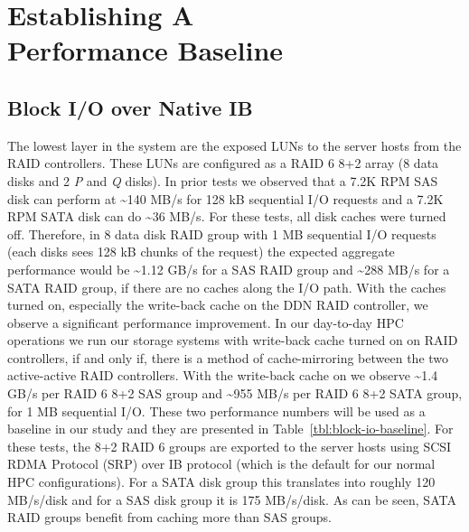 \section{Establishing A \\Performance Baseline}
\label{sec:baseline}

\subsection{Block I/O over Native IB} 
\label{sec:block-io}

The lowest layer in the system are the exposed LUNs to the server hosts from
the RAID controllers.  These LUNs are configured as a RAID 6 8+2 array (8 data
disks and 2 \textit{P} and \textit{Q} disks). In prior tests we observed
that a 7.2K RPM SAS disk can perform at \textasciitilde140 MB/s for 128 kB
sequential I/O requests and a 7.2K RPM SATA disk can do \textasciitilde36 MB/s.
For these tests, all disk caches were turned off. Therefore, in 8 data disk
RAID group with 1 MB sequential I/O requests (each disks sees 128 kB chunks of
the request) the expected aggregate performance would be \textasciitilde1.12
GB/s for a SAS RAID group and \textasciitilde288 MB/s for a SATA RAID group, if
there are no caches along the I/O path.  With the caches turned on, especially
the write-back cache on the DDN RAID controller, we observe a significant
performance improvement. In our day-to-day HPC operations we run our storage
systems with write-back cache turned on on RAID controllers, if and only if,
there is a method of cache-mirroring between the two active-active RAID
controllers. With the write-back cache on we observe \textasciitilde1.4 GB/s
per RAID 6 8+2 SAS group and  \textasciitilde955 MB/s per RAID 6 8+2 SATA
group, for 1 MB sequential I/O.  These two performance numbers will be used as
a baseline in our study and they are presented in
Table~\ref{tbl:block-io-baseline}.  For these tests, the 8+2 RAID 6 groups are
exported to the server hosts using SCSI RDMA Protocol (SRP) over IB protocol
(which is the default for our normal HPC configurations). For a SATA disk group
this translates into roughly 120 MB/s/disk and for a SAS disk group it is 175
MB/s/disk. As can be seen, SATA RAID groups benefit from caching more than SAS
groups. 


